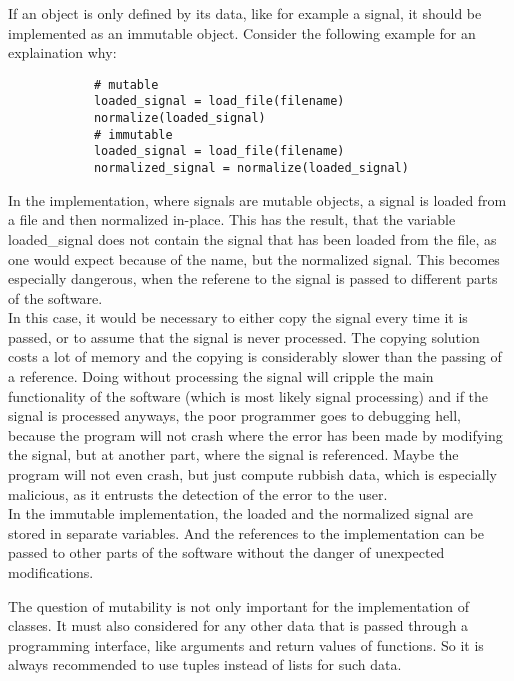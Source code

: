 		If an object is only defined by its data, like for example a signal, it should be implemented as an immutable object.
		Consider the following example for an explaination why:
		\begin{verbatim}
			# mutable
			loaded_signal = load_file(filename)
			normalize(loaded_signal)
			# immutable
			loaded_signal = load_file(filename)
			normalized_signal = normalize(loaded_signal)
		\end{verbatim}
		In the implementation, where signals are mutable objects, a signal is loaded from a file and then normalized in-place.
		This has the result, that the variable {\normalfont \ttfamily loaded\_signal} does not contain the signal that has been loaded from the file, as one would expect because of the name, but the normalized signal.
		This becomes especially dangerous, when the referene to the signal is passed to different parts of the software.\\
		In this case, it would be necessary to either copy the signal every time it is passed, or to assume that the signal is never processed.
		The copying solution costs a lot of memory and the copying is considerably slower than the passing of a reference.
		Doing without processing the signal will cripple the main functionality of the software (which is most likely signal processing) and if the signal is processed anyways, the poor programmer goes to debugging hell, because the program will not crash where the error has been made by modifying the signal, but at another part, where the signal is referenced.
		Maybe the program will not even crash, but just compute rubbish data, which is especially malicious, as it entrusts the detection of the error to the user.\\
		In the immutable implementation, the loaded and the normalized signal are stored in separate variables.
		And the references to the implementation can be passed to other parts of the software without the danger of unexpected modifications.

		The question of mutability is not only important for the implementation of classes.
		It must also considered for any other data that is passed through a programming interface, like arguments and return values of functions.
		So it is always recommended to use tuples instead of lists for such data.

